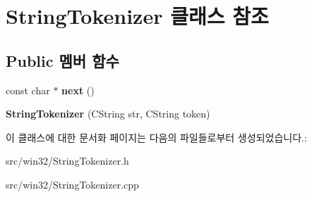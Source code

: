 \hypertarget{class_string_tokenizer}{}\section{String\+Tokenizer 클래스 참조}
\label{class_string_tokenizer}
\subsection*{Public 멤버 함수}
\begin{DoxyCompactItemize}
\item 
\mbox{\label{class_string_tokenizer_abeba9010a819d5d0bf8436894f71f049}} 
const char $\ast$ {\bfseries next} ()
\item 
\mbox{\label{class_string_tokenizer_aad9d79efdc0b06f3ac696ed650d2f392}} 
{\bfseries String\+Tokenizer} (C\+String str, C\+String token)
\end{DoxyCompactItemize}


이 클래스에 대한 문서화 페이지는 다음의 파일들로부터 생성되었습니다.\+:\begin{DoxyCompactItemize}
\item 
src/win32/String\+Tokenizer.\+h\item 
src/win32/String\+Tokenizer.\+cpp\end{DoxyCompactItemize}
